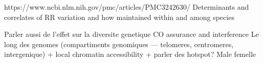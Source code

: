 https://www.ncbi.nlm.nih.gov/pmc/articles/PMC3242630/
Determinants and correlates of RR variation and how maintained within and among species

Parler aussi de l'effet sur la diversite genetique
CO assurance and interference
Le long des genomes (compartiments genomiques — telomeres, centromeres, intergenique) + local chromatin accessibility + parler des hotspot?
Male femelle



%


%


